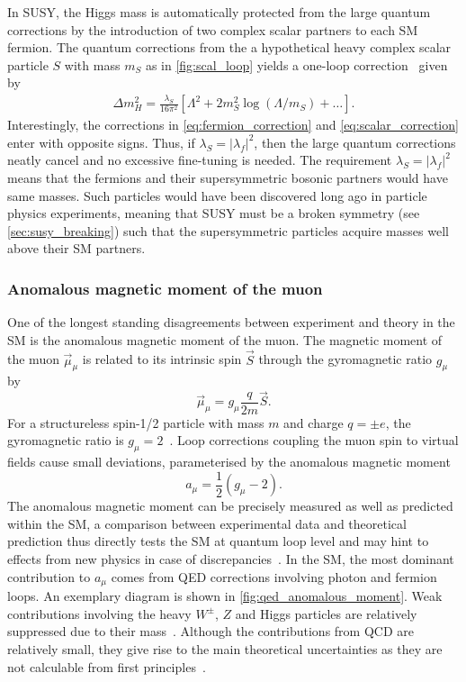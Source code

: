 In SUSY, the Higgs mass is automatically protected from the large quantum corrections by the introduction of two complex scalar partners to each SM fermion. The quantum corrections from the a hypothetical heavy complex scalar particle $S$ with mass $m_S$ as in \cref{fig:scal_loop} yields a one-loop correction~\cite{Martin:1997ns} given by 
\begin{align}
	\Delta m_H^2 = \frac{\lambda_S}{16\pi^2}\left[\Lambda^2 + 2m_S^2\log\left(\Lambda/m_S\right)+ \dots\right].
	\label{eq:scalar_correction}
\end{align}
Interestingly, the corrections in \cref{eq:fermion_correction} and \cref{eq:scalar_correction} enter with opposite signs. Thus, if $\lambda_S = \vert\lambda_f\vert^2$, then the large quantum corrections neatly cancel and no excessive fine-tuning is needed. The requirement $\lambda_S = \vert\lambda_f\vert^2$ means that the fermions and their supersymmetric bosonic partners would have same masses. Such particles would have been discovered long ago in particle physics experiments, meaning that SUSY must be a broken symmetry (see \cref{sec:susy_breaking}) such that the supersymmetric particles acquire masses well above their SM partners. 

\subsubsection{Anomalous magnetic moment of the muon}

One of the longest standing disagreements between experiment and theory in the SM is the anomalous magnetic moment of the muon. The magnetic moment of the muon $\vec{\mu}_\mu$ is related to its intrinsic spin $\vec{S}$ through the gyromagnetic ratio $g_\mu$ by
\begin{equation}
	\vec{\mu}_\mu = g_\mu \frac{q}{2m} \vec{S}.
\end{equation}
For a structureless spin-1/2 particle with mass $m$ and charge $q=\pm e$, the gyromagnetic ratio is $g_\mu = 2$~\cite{Bennett:2006fi}. Loop corrections coupling the muon spin to virtual fields cause small deviations, parameterised by the anomalous magnetic moment
\begin{equation}
	a_\mu = \frac{1}{2}(g_\mu-2).
\end{equation}
The anomalous magnetic moment can be precisely measured as well as predicted within the SM, a comparison between experimental data and theoretical prediction thus directly tests the SM at quantum loop level and may hint to effects from new physics in case of discrepancies~\cite{baer_tata_2006}. In the SM, the most dominant contribution to $a_\mu$ comes from QED corrections involving photon and fermion loops. An exemplary diagram is shown in \cref{fig:qed_anomalous_moment}. Weak contributions involving the heavy $W^\pm$, $Z$ and Higgs particles are relatively suppressed due to their mass~\cite{pdg2020}. Although the contributions from QCD are relatively small, they give rise to the main theoretical uncertainties as they are not calculable from first principles~\cite{pdg2020}.

